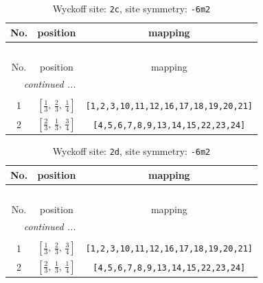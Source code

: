 \documentclass[fleqn,8pt]{jsarticle}
\begin{document}
\renewcommand{\arraystretch}{1.2}
\begin{longtable}{ccc}
\caption{Wyckoff site: {\tt 2c}, site symmetry: {\tt -6m2}}
 \\
 \hline \hline
No. & position & mapping \\ \hline \endfirsthead

\multicolumn{2}{l}{\tablename\ \thetable{}} \\
 \hline \hline
No. & position & mapping \\ \hline \endhead

 \hline \hline
\multicolumn{2}{r}{\footnotesize\it continued ...} \\ \endfoot

 \hline \hline
\multicolumn{2}{r}{} \\ \endlastfoot

1 & $\left[ \frac{1}{3},\, \frac{2}{3},\, \frac{1}{4} \right]$ & {\tt [1,2,3,10,11,12,16,17,18,19,20,21]} \\ \hline
2 & $\left[ \frac{2}{3},\, \frac{1}{3},\, \frac{3}{4} \right]$ & {\tt [4,5,6,7,8,9,13,14,15,22,23,24]} \\
\end{longtable}
\renewcommand{\arraystretch}{1.2}
\begin{longtable}{ccc}
\caption{Wyckoff site: {\tt 2d}, site symmetry: {\tt -6m2}}
 \\
 \hline \hline
No. & position & mapping \\ \hline \endfirsthead

\multicolumn{2}{l}{\tablename\ \thetable{}} \\
 \hline \hline
No. & position & mapping \\ \hline \endhead

 \hline \hline
\multicolumn{2}{r}{\footnotesize\it continued ...} \\ \endfoot

 \hline \hline
\multicolumn{2}{r}{} \\ \endlastfoot

1 & $\left[ \frac{1}{3},\, \frac{2}{3},\, \frac{3}{4} \right]$ & {\tt [1,2,3,10,11,12,16,17,18,19,20,21]} \\ \hline
2 & $\left[ \frac{2}{3},\, \frac{1}{3},\, \frac{1}{4} \right]$ & {\tt [4,5,6,7,8,9,13,14,15,22,23,24]} \\
\end{longtable}
\renewcommand{\arraystretch}{1.2}
\end{document}
